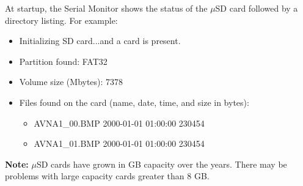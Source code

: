 At startup, the Serial Monitor shows the status of the $\mu$SD card followed by a directory listing. For example:
\begin{itemize}
  \item Initializing SD card...and a card is present.
  \item Partition found: FAT32
  \item Volume size (Mbytes): 7378
  \item Files found on the card (name, date, time, and size in bytes):
  \begin{itemize}
   \item AVNA1\_00.BMP  2000-01-01 01:00:00 230454
   \item AVNA1\_01.BMP  2000-01-01 01:00:00 230454
   \end{itemize}
\end{itemize}

\textbf{Note:} $\mu$SD cards have grown in GB capacity over the years.  There may be problems with large capacity cards greater than 8 GB.
